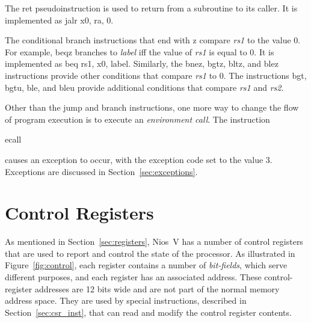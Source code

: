 \documentclass[11pt, twoside, pdftex]{article}
\begin{document}
The {\sf ret} pseudoinstruction is used to return from a subroutine to its caller. It is
implemented as {\sf jalr x0, ra, 0}.

The conditional branch instructions that end with {\sf z} compare {\it rs1} to the value 0.
For example, {\sf beqz} branches to {\it label} iff the value of {\it rs1} is equal to 0. 
It is implemented as {\sf beq rs1, x0, label}. Similarly, the {\sf bnez}, {\sf bgtz},
{\sf bltz}, and {\sf blez} instructions provide other conditions that compare {\it rs1} to 0.
The instructions {\sf bgt}, {\sf bgtu}, {\sf ble}, and {\sf bleu} provide additional 
conditions that compare {\it rs1} and {\it rs2}. 

Other than the jump and branch instructions, one more way to change the flow of program 
execution is to execute an {\it environment call}. The instruction
\vspace{-\baselineskip}
\begin{center}
{\sf ecall}
\end{center}
causes an exception to occur, with the exception code set to the value 3. Exceptions are
discussed in Section~\ref{sec:exceptions}.

\section{Control Registers}
\label{sec:control}

As mentioned in Section~\ref{sec:registers}, Nios~V has a number of control registers
that are used to report and control the state of the processor. As illustrated in 
Figure~\ref{fig:control}, each register contains a number of {\it bit-fields}, which serve 
different purposes, and each register has an associated address. These control-register
addresses are 12 bits wide and are not part of the normal memory address space. They  
are used by special instructions, described in Section~\ref{sec:csr_inst}, that can read 
and modify the control register contents. 
\end{document}
